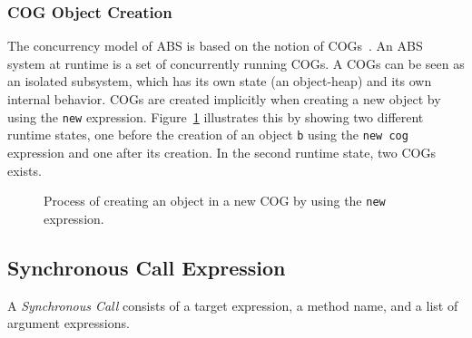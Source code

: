 \subsubsection{COG Object Creation}
The concurrency model of ABS is based on the notion of COGs~\cite{johnsen10fmco}.
An ABS system at runtime is a set of concurrently running COGs. A COGs can be seen as an isolated subsystem, which has its own state (an object-heap) and its own internal behavior.
COGs are created implicitly when creating a new object by using the \verb_new_ expression.
Figure~\ref{fig:newCogExpr} illustrates this by showing two different runtime states, one before the creation of an object \verb_b_ using the \verb_new cog_ expression and one after its creation. In the second runtime state, two COGs exists. 

\begin{figure}
\centering
{}
\caption{Process of creating an object in a new COG by using the \texttt{new} expression.}
\label{fig:newCogExpr}
\end{figure}


\subsection{Synchronous Call Expression}
A \emph{Synchronous Call} consists of a target expression, a method name, and a list of argument expressions.

